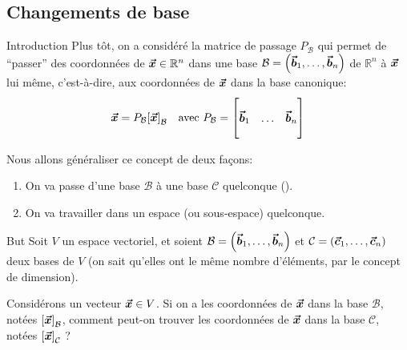 \documentclass[a4paper]{article}
\begin{document}
\subsection{Changements de base}
\begin{parag}{Introduction}
    Plus tôt, on a considéré la matrice de passage $P_{\mathcal{B}}$ qui permet de ``passer'' des coordonnées de $\bm{\protect\vec{x}} \in \mathbb{R}^{n}$ dans une base $\mathcal{B} = \left(\bvec{b}_1, \ldots, \bvec{b}_n\right)$ de $\mathbb{R}^{n}$ à $\bm{\protect\vec{x}}$ lui même, c'est-à-dire, aux coordonnées de $\bm{\protect\vec{x}}$ dans la base canonique:
    \[\bvec{x} = P_{\mathcal{B}} \left[\bvec{x}\right]_{\mathcal{B}} \mathspace \text{avec } P_{\mathcal{B}} = \begin{bmatrix}  &  &  \\ \bvec{b}_1 & \ldots & \bvec{b}_n \\  &  &  \end{bmatrix} \]

    Nous allons généraliser ce concept de deux façons:
    \begin{enumerate}
        \item On va passe d'une base $\mathcal{B}$ à une base $\mathcal{C}$ quelconque ().
        \item On va travailler dans un espace (ou sous-espace) quelconque.
    \end{enumerate}
\end{parag}

\begin{parag}{But}
    Soit $V$ un espace vectoriel, et soient $\mathcal{B} = \left(\bvec{b}_1, \ldots, \bvec{b}_n\right)$ et $\mathcal{C} = \left(\bvec{c}_1, \ldots, \bvec{c}_n\right)$ deux bases de $V$ (on sait qu'elles ont le même nombre d'éléments, par le concept de dimension).

    Considérons un vecteur $\bm{\protect\vec{x}} \in V$. Si on a les coordonnées de $\bm{\protect\vec{x}}$ dans la base $\mathcal{B}$, notées $\left[\bvec{x}\right]_{\mathcal{B}}$, comment peut-on trouver les coordonnées de $\bm{\protect\vec{x}}$ dans la base $\mathcal{C}$, notées $\left[\bvec{x}\right]_{\mathcal{C}}$ ?
\end{parag}
\end{document}
